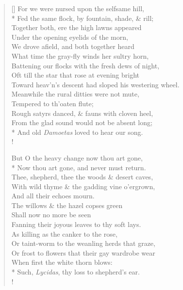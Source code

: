 \documentclass[MAIN]{subfiles}
\begin{document}
\begin{verse}[\versewidth]
For we were nursed upon the selfsame hill,\\*
Fed the same flock, by fountain, shade, \& rill;\\
Together both, ere the high lawns appeared\\
Under the opening eyelids of the morn,\\
We drove afield, and both together heard\\
What time the gray-fly winds her sultry horn,\\
Battening our flocks with the fresh dews of night,\\
Oft till the star that rose at evening bright\\
Toward heav'n's descent had sloped his westering wheel.\\
Meanwhile the rural ditties were not mute,\\
Tempered to th'oaten flute;\\
Rough satyrs danced, \& fauns with cloven heel,\\
From the glad sound would not be absent long;\\*
And old \emph{Damoetas} loved to hear our song.\\!

But O the heavy change now thou art gone,\\*
Now thou art gone, and never must return.\\
Thee, shepherd, thee the woods \& desert caves,\\
With wild thyme \& the gadding vine o'ergrown,\\
And all their echoes mourn.\\
The willows \& the hazel copses green\\
Shall now no more be seen\\
Fanning their joyous leaves to thy soft lays.\\
As killing as the canker to the rose,\\
Or taint-worm to the weanling herds that graze,\\
Or frost to flowers that their gay wardrobe wear\\
When first the white thorn blows:\\*
Such, \emph{Lycidas}, thy loss to shepherd's ear.\\!


\end{verse}
\end{document}

